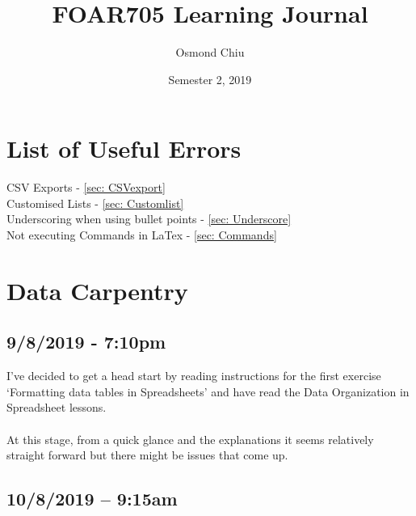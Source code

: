 \documentclass{article}
\title{FOAR705 Learning Journal}
\author{Osmond Chiu}
\date{Semester 2, 2019}
\begin{document}
\maketitle
\tableofcontents
\newpage

\section{List of Useful Errors}

CSV Exports - \autoref{sec: CSVexport}\\
Customised Lists - \autoref{sec: Customlist}\\
Underscoring when using bullet points - \autoref{sec: Underscore}\\
Not executing Commands in LaTex - \autoref{sec: Commands}\\

\newpage
\section{Data Carpentry}
\subsection*{9/8/2019 - 7:10pm}
I’ve decided to get a head start by reading instructions for the first exercise ‘Formatting data tables in Spreadsheets’ and have read the Data Organization in Spreadsheet lessons.\\
\\
At this stage, from a quick glance and the explanations it seems relatively straight forward but there might be issues that come up.\par
\subsection*{10/8/2019 – 9:15am}
\end{document}
